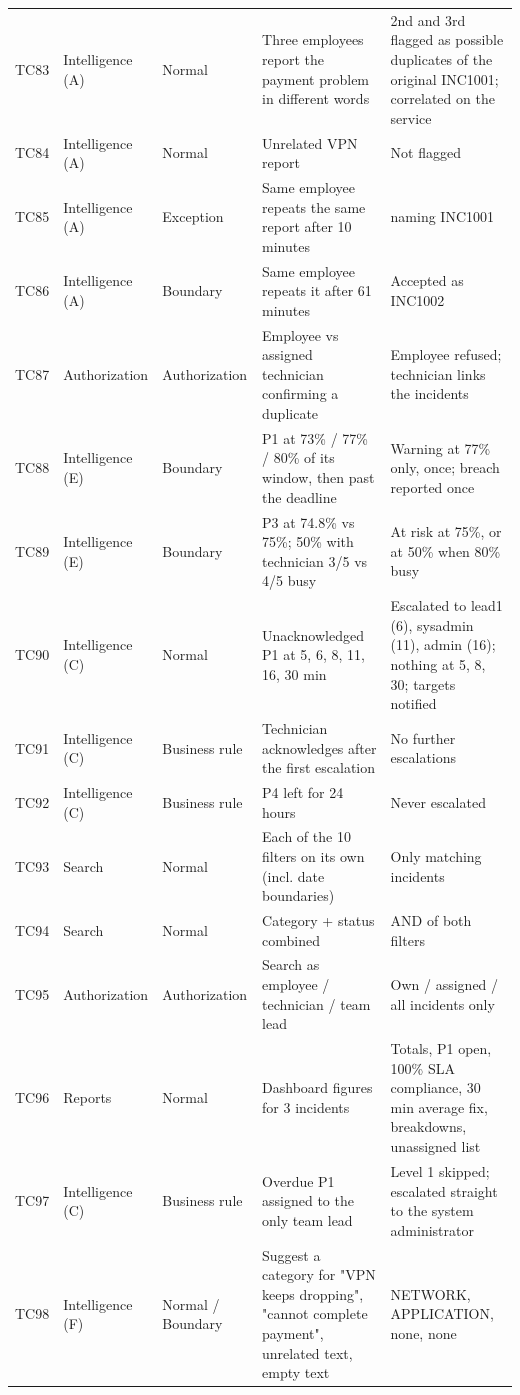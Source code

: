 \begin{longtable}{@{}L{1.0cm}L{1.85cm}L{2.15cm}L{4.05cm}L{5.45cm}@{}}
TC83 & Intelligence (A) & Normal & Three employees report the payment problem in different words & 2nd and 3rd flagged as possible duplicates of the original INC1001; correlated on the service \\
TC84 & Intelligence (A) & Normal & Unrelated VPN report & Not flagged \\
TC85 & Intelligence (A) & Exception & Same employee repeats the same report after 10 minutes &  naming INC1001 \\
TC86 & Intelligence (A) & Boundary & Same employee repeats it after 61 minutes & Accepted as INC1002 \\
TC87 & Authorization & Authorization & Employee vs assigned technician confirming a duplicate & Employee refused; technician links the incidents \\
TC88 & Intelligence (E) & Boundary & P1 at 73\% / 77\% / 80\% of its window, then past the deadline & Warning at 77\% only, once; breach reported once \\
TC89 & Intelligence (E) & Boundary & P3 at 74.8\% vs 75\%; 50\% with technician 3/5 vs 4/5 busy & At risk at 75\%, or at 50\% when 80\% busy \\
TC90 & Intelligence (C) & Normal & Unacknowledged P1 at 5, 6, 8, 11, 16, 30 min & Escalated to lead1 (6), sysadmin (11), admin (16); nothing at 5, 8, 30; targets notified \\
TC91 & Intelligence (C) & Business rule & Technician acknowledges after the first escalation & No further escalations \\
TC92 & Intelligence (C) & Business rule & P4 left for 24 hours & Never escalated \\
TC93 & Search & Normal & Each of the 10 filters on its own (incl. date boundaries) & Only matching incidents \\
TC94 & Search & Normal & Category + status combined & AND of both filters \\
TC95 & Authorization & Authorization & Search as employee / technician / team lead & Own / assigned / all incidents only \\
TC96 & Reports & Normal & Dashboard figures for 3 incidents & Totals, P1 open, 100\% SLA compliance, 30 min average fix, breakdowns, unassigned list \\
TC97 & Intelligence (C) & Business rule & Overdue P1 assigned to the only team lead & Level 1 skipped; escalated straight to the system administrator \\
TC98 & Intelligence (F) & Normal / Boundary & Suggest a category for "VPN keeps dropping", "cannot complete payment", unrelated text, empty text & NETWORK, APPLICATION, none, none \\

\end{longtable}
